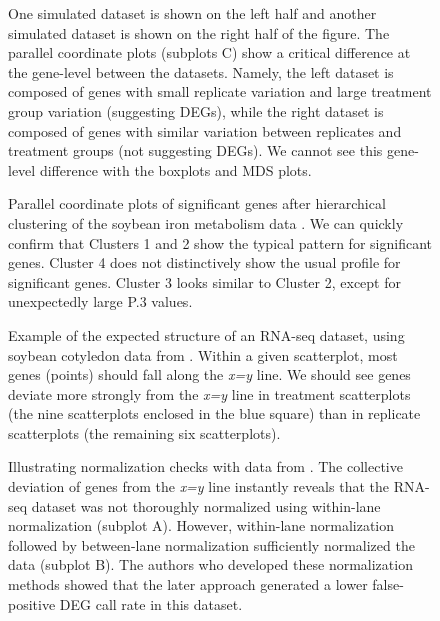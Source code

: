 \documentclass{bmcart}
\begin{document}
\begin{linenumbers}
\begin{backmatter}
\begin{figure}[h!]
\caption{
One simulated dataset is shown on the left half and another simulated dataset is shown on the right half of the figure. The parallel coordinate plots (subplots C) show a critical difference at the gene-level between the datasets. Namely, the left dataset is composed of genes with small replicate variation and large treatment group variation (suggesting DEGs), while the right dataset is composed of genes with similar variation between replicates and treatment groups (not suggesting DEGs). We cannot see this gene-level difference with the boxplots and MDS plots.
\label{simulatedData}}
\end{figure}

\begin{figure}[h!]
\caption{
Parallel coordinate plots of significant genes after hierarchical clustering of the soybean iron metabolism data \cite{Lauter16}. We can quickly confirm that Clusters 1 and 2 show the typical pattern for significant genes. Cluster 4 does not distinctively show the usual profile for significant genes. Cluster 3 looks similar to Cluster 2, except for unexpectedly large P.3 values.
\label{sbIRClustersSig}}
\end{figure}

\begin{figure}[h!]
\caption{
Example of the expected structure of an RNA-seq dataset, using soybean cotyledon data from \cite{Brown}. Within a given scatterplot, most genes (points) should fall along the \textit{x=y} line. We should see genes deviate more strongly from the \textit{x=y} line in treatment scatterplots (the nine scatterplots enclosed in the blue square) than in replicate scatterplots (the remaining six scatterplots).
\label{sbCNSM}}
\end{figure}

\begin{figure}[h!]
\caption{
Illustrating normalization checks with data from \cite{Risso}. The collective deviation of genes from the \textit{x=y} line instantly reveals that the RNA-seq dataset was not thoroughly normalized using within-lane normalization (subplot A). However, within-lane normalization followed by between-lane normalization sufficiently normalized the data (subplot B). The authors who developed these normalization methods showed that the later approach generated a lower false-positive DEG call rate in this dataset.
\label{yeastWithinBetween}}
\end{figure}


\end{backmatter}
\end{linenumbers}
\end{document}
